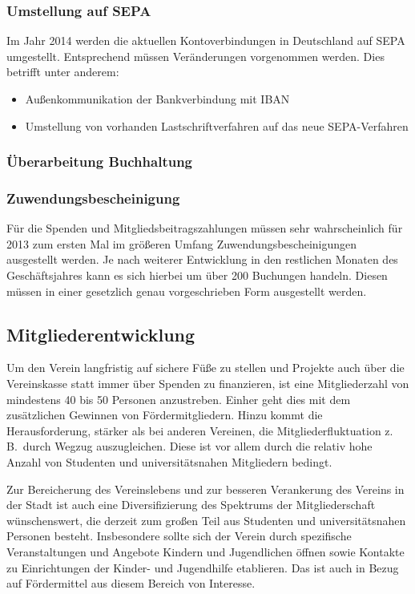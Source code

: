 \documentclass[10pt,DIV16]{scrartcl}
\begin{document}
\subsubsection{Umstellung auf SEPA}

Im Jahr 2014 werden die aktuellen Kontoverbindungen in Deutschland auf SEPA 
umgestellt. Entsprechend müssen Veränderungen vorgenommen werden. Dies 
betrifft unter anderem:

\begin{itemize}
	\item Außenkommunikation der Bankverbindung mit IBAN
	\item Umstellung von vorhanden Lastschriftverfahren auf das neue
		  SEPA-Verfahren
\end{itemize}

\subsubsection{Überarbeitung Buchhaltung}

\subsubsection{Zuwendungsbescheinigung}

Für die Spenden und Mitgliedsbeitragszahlungen müssen sehr
wahrscheinlich für 2013 zum ersten Mal im größeren Umfang
Zuwendungsbescheinigungen ausgestellt werden. Je nach weiterer
Entwicklung in den restlichen Monaten des Geschäftsjahres kann es sich
hierbei um über 200 Buchungen handeln. Diesen müssen in einer gesetzlich
genau vorgeschrieben Form ausgestellt werden.

\subsection{Mitgliederentwicklung}

Um den Verein langfristig auf sichere Füße zu stellen und Projekte auch über
die Vereinskasse statt immer über Spenden zu finanzieren, ist eine
Mitgliederzahl von mindestens 40 bis 50 Personen anzustreben.  Einher geht
dies mit dem zusätzlichen Gewinnen von Fördermitgliedern.  Hinzu kommt die
Herausforderung, stärker als bei anderen Vereinen, die Mitgliederfluktuation
z.\,B.\ durch Wegzug auszugleichen.  Diese ist vor allem durch die relativ
hohe Anzahl von Studenten und universitätsnahen Mitgliedern bedingt.

Zur Bereicherung des Vereinslebens und zur besseren Verankerung des Vereins in
der Stadt ist auch eine Diversifizierung des Spektrums der Mitgliederschaft
wünschenswert, die derzeit zum großen Teil aus Studenten und universitätsnahen
Personen besteht.  Insbesondere sollte sich der Verein durch spezifische
Veranstaltungen und Angebote Kindern und Jugendlichen öffnen sowie Kontakte zu
Einrichtungen der Kinder- und Jugendhilfe etablieren.  Das ist auch in Bezug
auf Fördermittel aus diesem Bereich von Interesse. 
\end{document}
